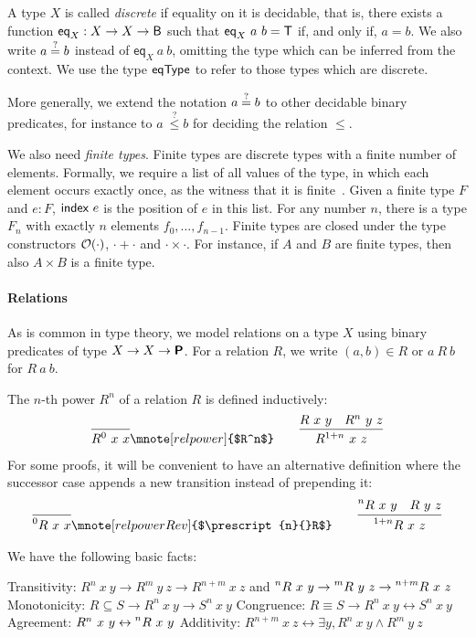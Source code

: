 A type $X$ is called \emph{discrete} if equality on it is decidable, that is, there exists a function $\textsf{eq}_X : X \rightarrow X \rightarrow \textsf{B}$ such that $\textsf{eq}_X~a~b = \mathsf{T}$ if, and only if, $a = b$. We also write $a\overset{?}{=}b$ instead of $\textsf{eq}_X~a~b$, omitting the type which can be inferred from the context. We use the type $\textsf{eqType}$ to refer to those types which are discrete.

More generally, we extend the notation $a\overset{?}{=}b$ to other decidable binary predicates, for instance to $a~\overset{?}{\le} b$ for deciding the relation $\le$.

We also need \emph{finite types}. Finite types are discrete types with a finite number of elements. Formally, we require a list of all values of the type, in which each element occurs exactly once, as the witness that it is finite~\cite{menz2016}. Given a finite type $F$ and $e : F$, $\textsf{index}~e$ is the position of $e$ in this list.
For any number $n$, there is a type $F_n$ with exactly $n$ elements $f_0, \ldots, f_{n-1}$.
Finite types are closed under the type constructors $\mathcal{O}{(\cdot)}$, $\cdot + \cdot$ and $\cdot \times \cdot$. For instance, if $A$ and $B$ are finite types, then also $A \times B$ is a finite type.

\paragraph{Relations}
As is common in type theory, we model relations on a type $X$ using binary predicates of type $X \rightarrow X \rightarrow \textsf{\bfseries P}$. 
For a relation $R$, we write $(a, b) \in R$ or $a~R~b$ for $R~a~b$. 

The $n$-th power $R^n$ of a relation $R$ is defined inductively:
\begin{align*}
  \infer{R^0~x~x}{}\mnote[relpower]{$R^n$}
  \qquad
  \infer{R^{\natS{n}}~x~z}{R~x~y\quad R^n~y~z}
\end{align*}
For some proofs, it will be convenient to have an alternative definition where the successor case appends a new transition instead of prepending it:
\begin{align*}
  \infer{\prescript{0}{}R~x~x}{}\mnote[relpowerRev]{$\prescript{n}{}R$}
  \qquad
  \infer{\prescript{\natS{n}}{}R~x~z}{\prescript{n}{}R~x~y\quad R~y~z}
\end{align*}

\begin{proposition}\label{prop:relpower}
  We have the following basic facts:
  \begin{enumerate}
     Transitivity: $R^n~x~y \rightarrow R^m~y~z \rightarrow R^{n+m}~x~z$ and $\prescript{n}{}R~x~y \rightarrow \prescript{m}{}R~y~z \rightarrow \prescript{n+m}{}R~x~z$
     Monotonicity: $R \subseteq S \rightarrow R^n~x~y \rightarrow S^n~x~y$
     Congruence: $R \equiv S \rightarrow R^n~x~y \leftrightarrow S^n~x~y$
     Agreement: $R^n~x~y \leftrightarrow \prescript{n}{}R~x~y$
     Additivity: $R^{n+m}~x~z \leftrightarrow \exists y, R^n~x~y \land R^m~y~z$
  \end{enumerate}
\end{proposition}

